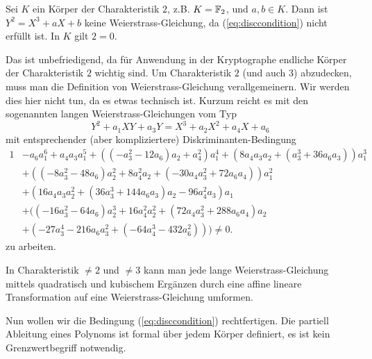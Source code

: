 \begin{bemerkung}
  Sei $K$ ein Körper der Charakteristik $2$, z.B. $K={\mathbb{F}}_2$, und
  $a,b\in K$. Dann ist $Y^2 = X^3+aX+b$ keine Weierstrass-Gleichung,
  da (\ref{eq:disccondition}) nicht erfüllt ist. In $K$ gilt $2=0$.

  Das ist  unbefriedigend, da für Anwendung in der Kryptographe
  endliche Körper 
  der Charakteristik $2$ wichtig sind. Um Charakteristik $2$ (und auch
  $3$) abzudecken, muss man die Definition von Weierstrass-Gleichung
  verallgemeinern. Wir werden dies hier nicht tun, da es etwas
  technisch ist. Kurzum reicht es mit den sogenannten langen
  Weierstrass-Gleichungen vom Typ
  \begin{equation*}
    Y^2 + a_1 XY + a_3 Y = X^3+a_2 X^2 + a_4 X + a_6
  \end{equation*}
  mit entsprechender (aber kompliziertere) Diskriminanten-Bedingung
  \begin{alignat*}1
    &-a_6 a_1^6 + a_4 a_3 a_1^5 + ((-a_3^2 - 12 a_6) a_2 + a_4^2) a_1^4 +
    (8 a_4 a_3 a_2 + (a_3^3 + 36 a_6 a_3)) a_1^3\\
    &+ ((-8 a_3^2 - 48 a_6) a_2^2 +
    8 a_4^2 a_2 +
    (-30 a_4 a_3^2 + 72 a_6 a_4)) a_1^2 \\
    &+ (16 a_4 a_3 a_2^2 +
    (36 a_3^3 + 144 a_6 a_3) a_2 - 96 a_4^2 a_3) a_1 \\
    &+ ((-16 a_3^2 -
    64 a_6) a_2^3 + 16 a_4^2 a_2^2 + (72 a_4 a_3^2 + 288 a_6 a_4) a_2
    \\
    & +
    (-27 a_3^4 - 216 a_6 a_3^2 + (-64 a_4^3 - 432 a_6^2))) \not=0.
  \end{alignat*}
  zu arbeiten.

  In Charakteristik $\not=2$ und $\not=3$ kann man jede lange
  Weierstrass-Gleichung mittels quadratisch und kubischem Ergänzen
  durch eine affine lineare Transformation auf eine
  Weierstrass-Gleichung umformen. 
\end{bemerkung}

Nun wollen wir die Bedingung (\ref{eq:disccondition}) rechtfertigen.
Die partiell Ableitung eines Polynoms ist formal über jedem Körper
definiert, es ist kein Grenzwertbegriff notwendig.

